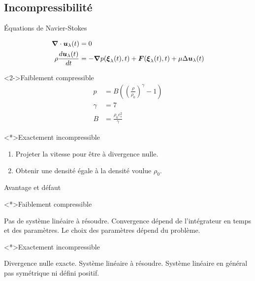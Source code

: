 \subsection{Incompressibilité}
\begin{frame}[<+->]{Équations de Navier-Stokes}
 
\begin{align*}
{\boldsymbol {\nabla}} \cdot {\boldsymbol {u}}_{\lambda}(t)&=0\\
\rho\frac{d {\boldsymbol {u}}_{\lambda}(t)}{d t}&=-{\boldsymbol {\nabla}} p({\boldsymbol {\xi}}_{\lambda}(t),t)+{\boldsymbol {F}}({\boldsymbol {\xi}}_{\lambda}(t),t)+\mu \Delta {\boldsymbol {u}}_{\lambda}(t)
\end{align*}

\begin{block}<2->{Faiblement compressible}
\begin{align*}
 p&=B\left(\left(\frac{\rho}{\rho_{0}}\right)^\gamma-1\right)\\
 \gamma&=7\\
 B&=\frac{\rho_0 c_s^2}{\gamma}
 \end{align*}
\end{block}

\begin{block}<*>{Exactement incompressible}
 \begin{enumerate}
  \item<3-> Projeter la vitesse pour être à divergence nulle.
  \item<4-> Obtenir une densité égale à la densité voulue $\rho_0$.
 \end{enumerate}
\end{block}

\end{frame}

\begin{frame}[<+->]{Avantage et défaut}
 \begin{block}<*>{Faiblement compressible}
  \begin{itemize}
   \plusitem Pas de système linéaire à résoudre.
   \moinsitem Convergence dépend de l'intégrateur en temps et des paramètres.
   \moinsitem Le choix des paramètres dépend du problème.
  \end{itemize}

 \end{block}
 
 \begin{block}<*>{Exactement incompressible}
 \begin{itemize}
  \plusitem Divergence nulle exacte.
  \moinsitem Système linéaire à résoudre.
  \moinsitem Système linéaire en général pas symétrique ni défini positif.
 \end{itemize}
  
 \end{block}

\end{frame}
